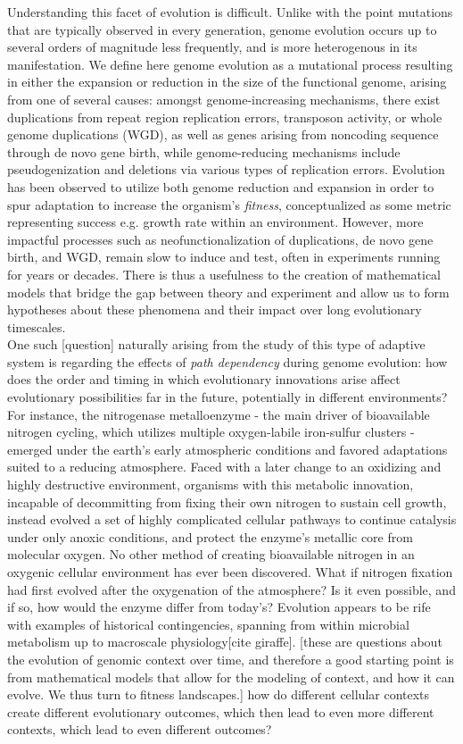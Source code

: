 \documentclass[paper=a4, fontsize=11pt,twoside]{scrartcl}       %
\begin{document}
Understanding this facet of evolution is difficult. Unlike with the point mutations that are typically observed in every generation, genome evolution occurs up to several orders of magnitude less frequently, and is more heterogenous in its manifestation. We define here genome evolution as a mutational process resulting in either the expansion or reduction in the size of the functional genome, arising from one of several causes: amongst genome-increasing mechanisms, there exist duplications from repeat region replication errors, transposon activity, or whole genome duplications (WGD), as well as genes arising from noncoding sequence through de novo gene birth, while genome-reducing mechanisms include pseudogenization and deletions via various types of replication errors. Evolution has been observed to utilize both genome reduction and expansion in order to spur adaptation to increase the organism's \textit{fitness}, conceptualized as some metric representing success e.g. growth rate within an environment. However, more impactful processes such as neofunctionalization of duplications, de novo gene birth, and WGD, remain slow to induce and test, often in experiments running for years or decades. There is thus a usefulness to the creation of mathematical models that bridge the gap between theory and experiment and allow us to form hypotheses about these phenomena and their impact over long evolutionary timescales.\\

One such [question] naturally arising from the study of this type of adaptive system is regarding the effects of \textit{path dependency} during genome evolution: how does the order and timing in which evolutionary innovations arise affect evolutionary possibilities far in the future, potentially in different environments? For instance, the nitrogenase metalloenzyme - the main driver of bioavailable nitrogen cycling, which utilizes multiple oxygen-labile iron-sulfur clusters - emerged under the earth's early atmospheric conditions and favored adaptations suited to a reducing atmosphere. Faced with a later change to an oxidizing and highly destructive environment, organisms with this metabolic innovation, incapable of decommitting from fixing their own nitrogen to sustain cell growth, instead evolved a set of highly complicated cellular pathways to continue catalysis under only anoxic conditions, and protect the enzyme's metallic core from molecular oxygen. No other method of creating bioavailable nitrogen in an oxygenic cellular environment has ever been discovered. What if nitrogen fixation had first evolved after the oxygenation of the atmosphere? Is it even possible, and if so, how would the enzyme differ from today's? Evolution appears to be rife with examples of historical contingencies, spanning from within microbial metabolism up to macroscale physiology[cite giraffe]. [these are questions about the evolution of genomic context over time, and therefore a good starting point is from mathematical models that allow for the modeling of context, and how it can evolve. We thus turn to fitness landscapes.] how do different cellular contexts create different evolutionary outcomes, which then lead to even more different contexts, which lead to even different outcomes?
\end{document}
